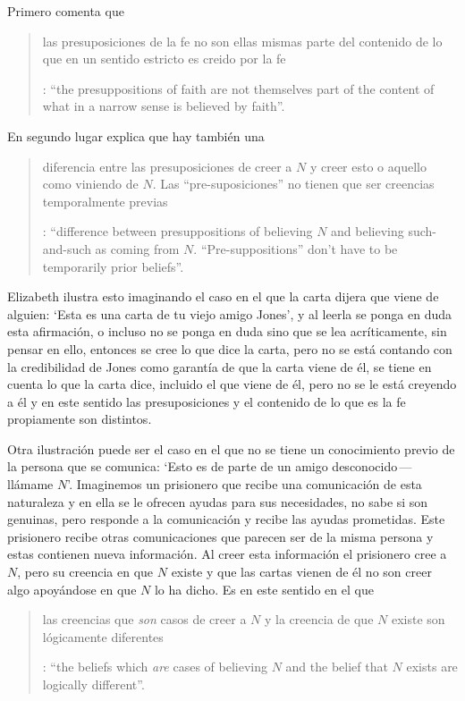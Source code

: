 Primero comenta que \blockquote[{\Cite[117]{anscombe1981erp:faith}}: \enquote{the presuppositions of faith are not themselves part of the content of what in a narrow sense is believed by faith}.]{las presuposiciones de la fe no son ellas mismas parte del contenido de lo que en un sentido estricto es creido por la fe}. En segundo lugar explica que hay también una \blockquote[{\Cite[118]{anscombe1981erp:faith}}: \enquote{difference between presuppositions of believing $N$ and believing such-and-such as coming from $N$. ``Pre-suppositions'' don't have to be temporarily prior beliefs}.]{diferencia entre las presuposiciones de creer a $N$ y creer esto o aquello como viniendo de $N$. Las ``pre-suposiciones'' no tienen que ser creencias temporalmente previas}. Elizabeth ilustra esto imaginando el caso en el que la carta dijera que viene de alguien: \enquote*{Esta es una carta de tu viejo amigo Jones}, y al leerla se ponga en duda esta afirmación, o incluso no se ponga en duda sino que se lea acríticamente, sin pensar en ello, entonces se cree lo que dice la carta, pero no se está contando con la credibilidad de Jones como garantía de que la carta viene de él, se tiene en cuenta lo que la carta dice, incluido el que viene de él, pero no se le está creyendo a él y en este sentido las presuposiciones y el contenido de lo que es la fe propiamente son distintos. 

Otra ilustración puede ser el caso en el que no se tiene un conocimiento previo de la persona que se comunica: \enquote*{Esto es de parte de un amigo desconocido\,---\,llámame $N$}. Imaginemos un prisionero que recibe una comunicación de esta naturaleza y en ella se le ofrecen ayudas para sus necesidades, no sabe si son genuinas, pero responde a la comunicación y recibe las ayudas prometidas. Este prisionero recibe otras comunicaciones que parecen ser de la misma persona y estas contienen nueva información. Al creer esta información el prisionero cree a $N$, pero su creencia en que $N$ existe y que las cartas vienen de él no son creer algo apoyándose en que $N$ lo ha dicho. Es en este sentido en el que \blockquote[{\Cite[118]{anscombe1981erp:faith}}: \enquote{the beliefs which \emph{are} cases of believing $N$ and the belief that $N$ exists are logically different}.]{las creencias que \emph{son} casos de creer a $N$ y la creencia de que $N$ existe son lógicamente diferentes}.

